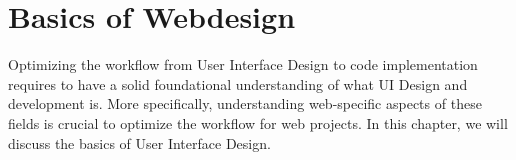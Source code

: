 \newpage
\section{Basics of Webdesign}
Optimizing the workflow from User Interface Design to code implementation requires to have a solid
foundational understanding of what UI Design and development is. More specifically, understanding
web-specific aspects of these fields is crucial to optimize the workflow for web projects. In this
chapter, we will discuss the basics of User Interface Design.





